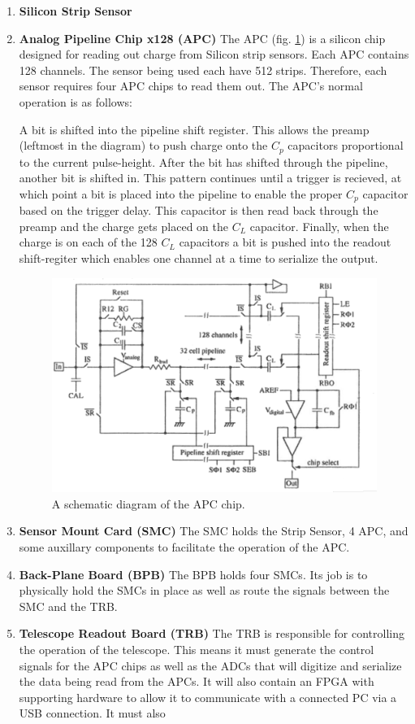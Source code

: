 \documentclass{article}
\newcommand{\itemt}[1]{\item \textbf{#1}}
\begin{document}
\begin{enumerate}
  \itemt{Silicon Strip Sensor}
  \itemt{Analog Pipeline Chip x128 (\gls{APC})}
    The \gls{APC} (fig. \ref{fig:APC128_Schematic}) is a silicon chip designed for reading out charge from Silicon strip sensors. Each \gls{APC} contains 128 channels. The sensor being used each have 512 strips. Therefore, each sensor requires four \gls{APC} chips to read them out. The \gls{APC}'s normal operation is as follows:

    A bit is shifted into the pipeline shift register. This allows the preamp (leftmost in the diagram) to push charge onto the $C_p$ capacitors proportional to the current pulse-height. After the bit has shifted through the pipeline, another bit is shifted in. This pattern continues until a trigger is recieved, at which point a bit is placed into the pipeline to enable the proper $C_p$ capacitor based on the trigger delay. This capacitor is then read back through the preamp and the charge gets placed on the $C_L$ capacitor. Finally, when the charge is on each of the 128 $C_L$ capacitors a bit is pushed into the readout shift-regiter which enables one channel at a time to serialize the output.

    \begin{figure}[h]
      \centering
      \includegraphics{./figures/APC128_Schematic.png}
      \caption{A schematic diagram of the \gls{APC} chip.}
      \label{fig:APC128_Schematic}
    \end{figure}

  \itemt{Sensor Mount Card (SMC)}
    The SMC holds the Strip Sensor, 4 \gls{APC}, and some auxillary components to facilitate the operation of the \gls{APC}.
  \itemt{Back-Plane Board (BPB)}
    The BPB holds four SMCs. Its job is to physically hold the SMCs in place as well as route the signals between the SMC and the TRB.
  \itemt{Telescope Readout Board (TRB)}
    The TRB is responsible for controlling the operation of the telescope. This means it must generate the control signals for the \gls{APC} chips as well as the ADCs that will digitize and serialize the data being read from the \gls{APC}s. It will also contain an FPGA with supporting hardware to allow it to communicate with a connected PC via a USB connection. It must also
\end{enumerate}
\end{document}
